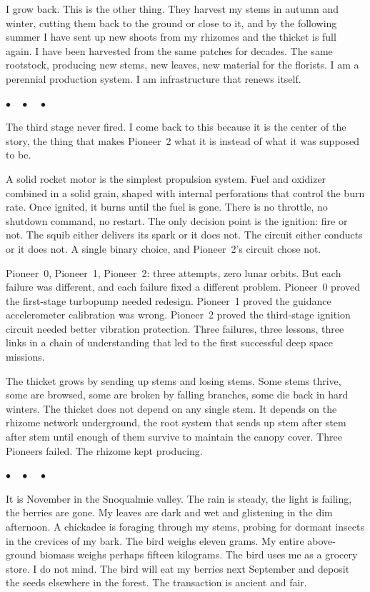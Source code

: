 \documentclass[12pt, letterpaper]{article}
\begin{document}
I grow back. This is the other thing. They harvest my stems in autumn and winter, cutting them back to the ground or close to it, and by the following summer I have sent up new shoots from my rhizomes and the thicket is full again. I have been harvested from the same patches for decades. The same rootstock, producing new stems, new leaves, new material for the florists. I am a perennial production system. I am infrastructure that renews itself.

\begin{center}
$\bullet\quad\bullet\quad\bullet$
\end{center}

The third stage never fired. I come back to this because it is the center of the story, the thing that makes Pioneer~2 what it is instead of what it was supposed to be.

A solid rocket motor is the simplest propulsion system. Fuel and oxidizer combined in a solid grain, shaped with internal perforations that control the burn rate. Once ignited, it burns until the fuel is gone. There is no throttle, no shutdown command, no restart. The only decision point is the ignition: fire or not. The squib either delivers its spark or it does not. The circuit either conducts or it does not. A single binary choice, and Pioneer~2's circuit chose not.

Pioneer~0, Pioneer~1, Pioneer~2: three attempts, zero lunar orbits. But each failure was different, and each failure fixed a different problem. Pioneer~0 proved the first-stage turbopump needed redesign. Pioneer~1 proved the guidance accelerometer calibration was wrong. Pioneer~2 proved the third-stage ignition circuit needed better vibration protection. Three failures, three lessons, three links in a chain of understanding that led to the first successful deep space missions.

The thicket grows by sending up stems and losing stems. Some stems thrive, some are browsed, some are broken by falling branches, some die back in hard winters. The thicket does not depend on any single stem. It depends on the rhizome network underground, the root system that sends up stem after stem after stem until enough of them survive to maintain the canopy cover. Three Pioneers failed. The rhizome kept producing.

\begin{center}
$\bullet\quad\bullet\quad\bullet$
\end{center}

It is November in the Snoqualmie valley. The rain is steady, the light is failing, the berries are gone. My leaves are dark and wet and glistening in the dim afternoon. A chickadee is foraging through my stems, probing for dormant insects in the crevices of my bark. The bird weighs eleven grams. My entire above-ground biomass weighs perhaps fifteen kilograms. The bird uses me as a grocery store. I do not mind. The bird will eat my berries next September and deposit the seeds elsewhere in the forest. The transaction is ancient and fair.
\end{document}
